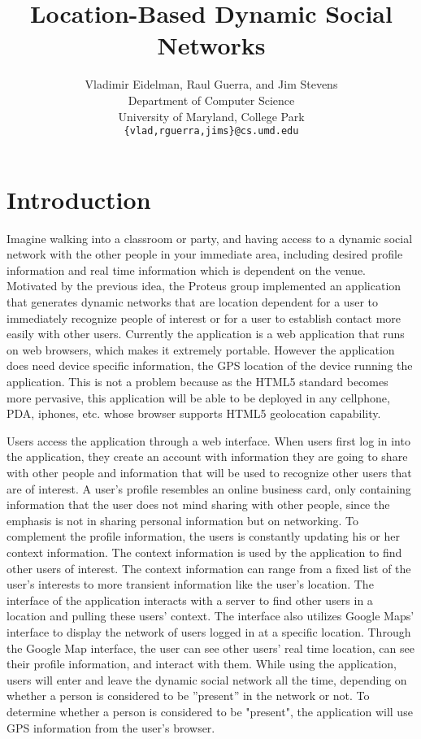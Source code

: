 \documentclass[11pt]{article}
\title{Location-Based Dynamic Social Networks}
\author{
   Vladimir Eidelman, Raul Guerra, and Jim Stevens\\
Department of Computer Science \\
University of Maryland, College Park\\
 { \tt \{vlad,rguerra,jims\}@cs.umd.edu}
}
\begin{document}
\maketitle 

\section{Introduction}


Imagine walking into a classroom or party, and having access to a dynamic social network with the other people in your immediate area, including desired profile information and real time information which is dependent on the venue. Motivated by the previous idea, the Proteus group implemented an application that generates dynamic networks that are location dependent for a user to immediately recognize people of interest or for a user to establish contact more easily with other users. Currently the application is a web application that runs on web browsers, which makes it extremely portable. However the application does need device specific information, the GPS location of the device running the application. This is not a problem because as the HTML5 standard becomes more pervasive, this application will be able to be deployed in any cellphone, PDA, iphones, etc. whose browser supports HTML5 geolocation capability.


Users access the application through a web interface. When users first log in into the application, they create an account with information they are going to share with other people and information that will be used to recognize other users that are of interest. A user's profile resembles an online business card, only containing information that the user does not mind sharing with other people, since the emphasis is not in sharing personal information but on networking.   To complement the profile information, the users is constantly updating his or her context information. The context information is used by the application to find other users of interest. The context information can range from a fixed list of the user's interests to more transient information like the user's location. The interface of the application interacts with a server to find other users in a location and pulling these users' context. The interface also utilizes Google Maps' interface to display the network of users logged in at a specific location. Through the Google Map interface, the user can see other users' real time location, can see their profile information, and interact with them. While using the application, users will enter and leave the dynamic social network all the time, depending on whether a person is considered to be ''present'' in the network or not. To determine whether a person is considered to be "present", the application will use GPS information from the user's browser.
\end{document}
